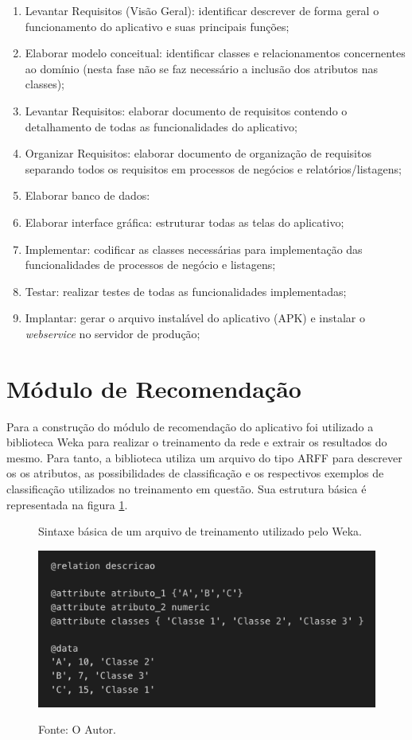 \begin{enumerate}
   \item Levantar Requisitos (Visão Geral): identificar descrever de forma geral o funcionamento do aplicativo e suas principais funções;
   \item Elaborar modelo conceitual: identificar classes e relacionamentos concernentes ao domínio (nesta fase não se faz necessário a inclusão dos atributos nas classes);
   \item Levantar Requisitos: elaborar documento de requisitos contendo o detalhamento de todas as funcionalidades do aplicativo;
   \item Organizar Requisitos: elaborar documento de organização de requisitos separando todos os requisitos em processos de negócios e relatórios/listagens;
   \item Elaborar banco de dados: 
   \item Elaborar interface gráfica: estruturar todas as telas do aplicativo;
   \item Implementar: codificar as classes necessárias para implementação das funcionalidades de processos de negócio e listagens;
   \item Testar: realizar testes de todas as funcionalidades implementadas;
   \item Implantar: gerar o arquivo instalável do aplicativo (APK) e instalar o \textit{webservice} no servidor de produção;
\end{enumerate}

\section{Módulo de Recomendação}

Para a construção do módulo de recomendação do aplicativo foi utilizado a biblioteca Weka para realizar o treinamento da rede e extrair os resultados do mesmo. Para tanto, a biblioteca utiliza um arquivo do tipo ARFF para descrever os os atributos, as possibilidades de classificação e os respectivos exemplos de classificação utilizados no treinamento em questão. Sua estrutura básica é representada na figura \ref{figura:arff}.

\begin{figure}[h]
	\caption{Sintaxe básica de um arquivo de treinamento utilizado pelo Weka.}
	\centering %
	\includegraphics[width=12cm]{resources/arff.png} %
	\label{figura:arff}	
	\caption*{Fonte: O Autor.}
\end{figure}

